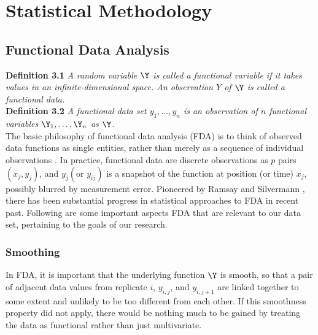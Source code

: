 \section{Statistical Methodology}

\subsection{Functional Data Analysis}
\noindent
{\bf{Definition 3.1}} {\emph{A random variable $\Y$ is called a functional variable if it takes values in an infinite-dimensional space. An observation $Y$ of $\Y$ is called a functional data. \cite{Ferraty_Vieu_2006_Nonparametric}}}\\
\noindent
{\bf{Definition 3.2}} {\emph{A functional data set $y_1, \dots, y_n$ is an observation of $n$ functional variables $\Y_1, \dots, \Y_n$ as $\Y$.}}\\

The basic philosophy of functional data analysis (FDA) is to think of observed data functions as single entities, rather than merely as a sequence of individual observations \cite{Ramsay_2006_Functional}. In
practice, functional data are discrete observations as $p$ pairs $(x_j, y_j)$, and $y_j (\text{or } y_{ij})$ is a snapshot of the function at position (or time) $x_j$, possibly blurred by measurement error. Pioneered by Ramsay and Silvermann \cite{Ramsay_2006_Functional}, there has been substantial progress in statistical approaches to FDA in recent past. Following are some important aspects FDA that are relevant to our data set, pertaining to the goals of our research. 

\subsubsection{Smoothing} \label{ch3_smooth}
In FDA, it is important that the underlying function $\Y$ is smooth, so that a pair of adjacent data values from replicate $i$, $y_{i,j}$, and $y_{i,j+1}$ are linked together to some extent and unlikely to be too different from each other. If this smoothness property did not apply, there would be nothing much to be gained by treating the data as functional rather than just multivariate. 

